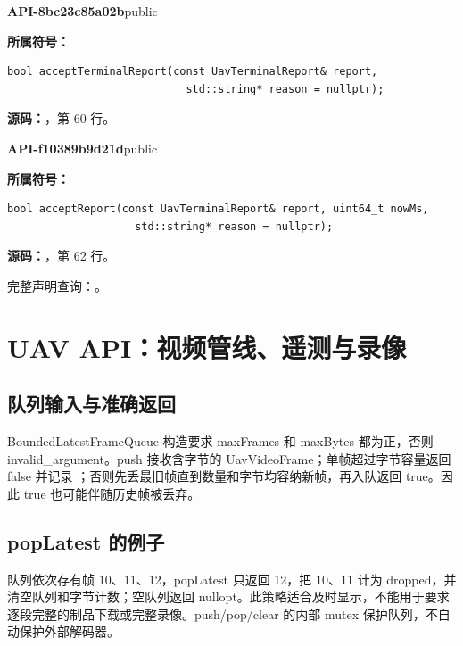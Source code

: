 \textbf{API-8bc23c85a02b}\quad public\par
\textbf{所属符号：}\par
\begin{Verbatim}[fontsize=\footnotesize,breaklines,breakanywhere]
bool acceptTerminalReport(const UavTerminalReport& report,
                            std::string* reason = nullptr);
\end{Verbatim}
\textbf{源码：}，第 60 行。\par

\textbf{API-f10389b9d21d}\quad public\par
\textbf{所属符号：}\par
\begin{Verbatim}[fontsize=\footnotesize,breaklines,breakanywhere]
bool acceptReport(const UavTerminalReport& report, uint64_t nowMs,
                    std::string* reason = nullptr);
\end{Verbatim}
\textbf{源码：}，第 62 行。\par

完整声明查询：。

\section{UAV API：视频管线、遥测与录像}

\subsection{队列输入与准确返回}
BoundedLatestFrameQueue 构造要求 maxFrames 和 maxBytes 都为正，否则 invalid\_argument。push 接收含字节的 UavVideoFrame；单帧超过字节容量返回 false 并记录 ；否则先丢最旧帧直到数量和字节均容纳新帧，再入队返回 true。因此 true 也可能伴随历史帧被丢弃。

\subsection{popLatest 的例子}
队列依次存有帧 10、11、12，popLatest 只返回 12，把 10、11 计为 dropped，并清空队列和字节计数；空队列返回 nullopt。此策略适合及时显示，不能用于要求逐段完整的制品下载或完整录像。push/pop/clear 的内部 mutex 保护队列，不自动保护外部解码器。


